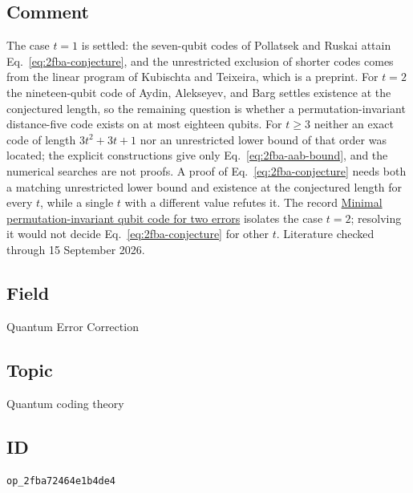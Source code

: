 \subsection*{Comment}

The case $t=1$ is settled: the seven-qubit codes of Pollatsek and Ruskai attain
Eq.~\eqref{eq:2fba-conjecture}, and the unrestricted exclusion of shorter codes
comes from the linear program of Kubischta and Teixeira, which is a preprint.
For $t=2$ the nineteen-qubit code of Aydin, Alekseyev, and Barg settles
existence at the conjectured length, so the remaining question is whether a
permutation-invariant distance-five code exists on at most eighteen qubits.  For
$t\geq3$ neither an exact code of length $3t^2+3t+1$ nor an unrestricted lower
bound of that order was located; the explicit constructions give only
Eq.~\eqref{eq:2fba-aab-bound}, and the numerical searches are not proofs.  A
proof of Eq.~\eqref{eq:2fba-conjecture} needs both a matching unrestricted lower
bound and existence at the conjectured length for every $t$, while a single $t$
with a different value refutes it.  The record
\href{https://qiqc-op.com/problem/op_a72722e455d85d55/}{Minimal permutation-invariant qubit code for two errors}
isolates the case $t=2$; resolving it would not decide
Eq.~\eqref{eq:2fba-conjecture} for other $t$.  Literature checked through
15 September 2026.

\subsection*{Field}

Quantum Error Correction

\subsection*{Topic}

Quantum coding theory

\subsection*{ID}

\texttt{op\_2fba72464e1b4de4}

